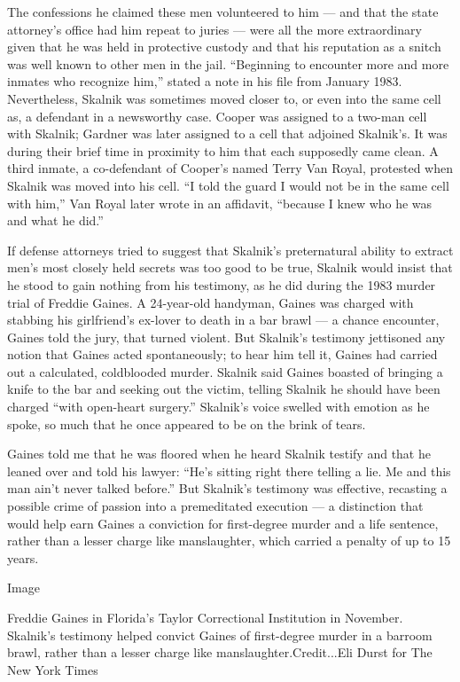 The confessions he claimed these men volunteered to him --- and that the
state attorney's office had him repeat to juries --- were all the more
extraordinary given that he was held in protective custody and that his
reputation as a snitch was well known to other men in the jail.
``Beginning to encounter more and more inmates who recognize him,''
stated a note in his file from January 1983. Nevertheless, Skalnik was
sometimes moved closer to, or even into the same cell as, a defendant in
a newsworthy case. Cooper was assigned to a two-man cell with Skalnik;
Gardner was later assigned to a cell that adjoined Skalnik's. It was
during their brief time in proximity to him that each supposedly came
clean. A third inmate, a co-defendant of Cooper's named Terry Van Royal,
protested when Skalnik was moved into his cell. ``I told the guard I
would not be in the same cell with him,'' Van Royal later wrote in an
affidavit, ``because I knew who he was and what he did.''

If defense attorneys tried to suggest that Skalnik's preternatural
ability to extract men's most closely held secrets was too good to be
true, Skalnik would insist that he stood to gain nothing from his
testimony, as he did during the 1983 murder trial of Freddie Gaines. A
24-year-old handyman, Gaines was charged with stabbing his girlfriend's
ex-lover to death in a bar brawl --- a chance encounter, Gaines told the
jury, that turned violent. But Skalnik's testimony jettisoned any notion
that Gaines acted spontaneously; to hear him tell it, Gaines had carried
out a calculated, coldblooded murder. Skalnik said Gaines boasted of
bringing a knife to the bar and seeking out the victim, telling Skalnik
he should have been charged ``with open-heart surgery.'' Skalnik's voice
swelled with emotion as he spoke, so much that he once appeared to be on
the brink of tears.

Gaines told me that he was floored when he heard Skalnik testify and
that he leaned over and told his lawyer: ``He's sitting right there
telling a lie. Me and this man ain't never talked before.'' But
Skalnik's testimony was effective, recasting a possible crime of passion
into a premeditated execution --- a distinction that would help earn
Gaines a conviction for first-degree murder and a life sentence, rather
than a lesser charge like manslaughter, which carried a penalty of up to
15 years.

Image

Freddie Gaines in Florida's Taylor Correctional Institution in November.
Skalnik's testimony helped convict Gaines of first-degree murder in a
barroom brawl, rather than a lesser charge like
manslaughter.Credit...Eli Durst for The New York Times

